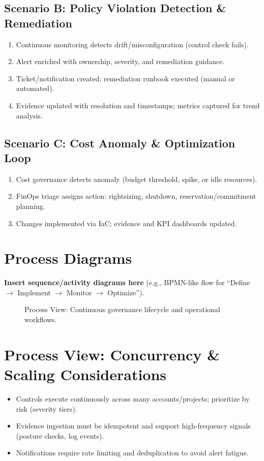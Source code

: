 \documentclass[11pt]{report}
\begin{document}
\subsection{Scenario B: Policy Violation Detection \& Remediation}
\begin{enumerate}
  \item Continuous monitoring detects drift/misconfiguration (control check fails).
  \item Alert enriched with ownership, severity, and remediation guidance.
  \item Ticket/notification created; remediation runbook executed (manual or automated).
  \item Evidence updated with resolution and timestamps; metrics captured for trend analysis.
\end{enumerate}

\subsection{Scenario C: Cost Anomaly \& Optimization Loop}
\begin{enumerate}
  \item Cost governance detects anomaly (budget threshold, spike, or idle resources).
  \item FinOps triage assigns action: rightsizing, shutdown, reservation/commitment planning.
  \item Changes implemented via IaC; evidence and KPI dashboards updated.
\end{enumerate}

\section{Process Diagrams}
\textbf{Insert sequence/activity diagrams here} (e.g., BPMN-like flow for “Define $\rightarrow$ Implement $\rightarrow$ Monitor $\rightarrow$ Optimize”).

\begin{figure}[htbp]
  \centering
  \caption{Process View: Continuous governance lifecycle and operational workflows.}
\end{figure}

\section{Process View: Concurrency \& Scaling Considerations}
\begin{itemize}
  \item Controls execute continuously across many accounts/projects; prioritize by risk (severity tiers).
  \item Evidence ingestion must be idempotent and support high-frequency signals (posture checks, log events).
  \item Notifications require rate limiting and deduplication to avoid alert fatigue.
\end{itemize}
\end{document}

